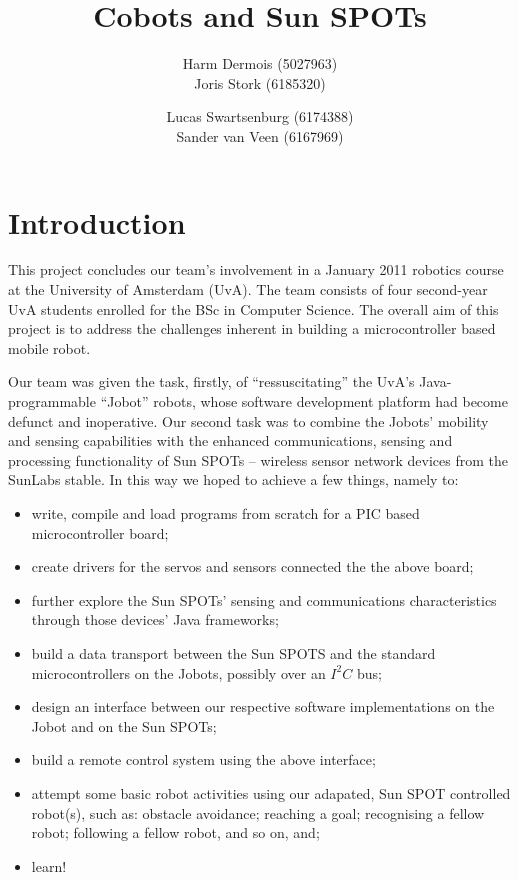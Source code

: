 \documentclass[a4paper,10pt]{article} %
\author{Harm Dermois (5027963) \\ Joris Stork (6185320) \and
Lucas Swartsenburg (6174388) \\ Sander van Veen (6167969)}
\title{Cobots and Sun SPOTs}
\begin{document}
\maketitle


\tableofcontents

\pagebreak

\section{Introduction} %

This project concludes our team's involvement in a January 2011 robotics course
at the University of Amsterdam (UvA). The team consists of four second-year UvA
students enrolled for the BSc in Computer Science. The overall aim of this
project is to address the challenges inherent in building a microcontroller
based mobile robot.

Our team was given the task, firstly, of ``ressuscitating'' the UvA's
Java-programmable ``Jobot'' robots, whose software development platform had
become defunct and inoperative. Our second task was to combine the Jobots'
mobility and sensing capabilities with the enhanced communications, sensing and
processing functionality of Sun SPOTs -- wireless sensor network devices from the
SunLabs stable. In this way we hoped to achieve a few things, namely to:

\begin{itemize}
    \item write, compile and load programs from scratch for a PIC based
    microcontroller board;
    \item create drivers for the servos and sensors connected the the above
    board;
    \item further explore the Sun SPOTs' sensing and communications
    characteristics through those devices' Java frameworks;
    \item build a data transport between the Sun
    SPOTS and the standard microcontrollers on the Jobots, possibly over
    an $I^2C$ bus;
    \item design an interface between our respective software implementations
    on the Jobot and on the Sun SPOTs;
    \item build a remote control system using the above interface;
    \item attempt some basic robot activities using our adapated, Sun SPOT
    controlled robot(s), such as: obstacle avoidance; reaching a goal;
    recognising a fellow robot; following a fellow robot, and so on, and;
    \item learn!
\end{itemize}
\end{document}
